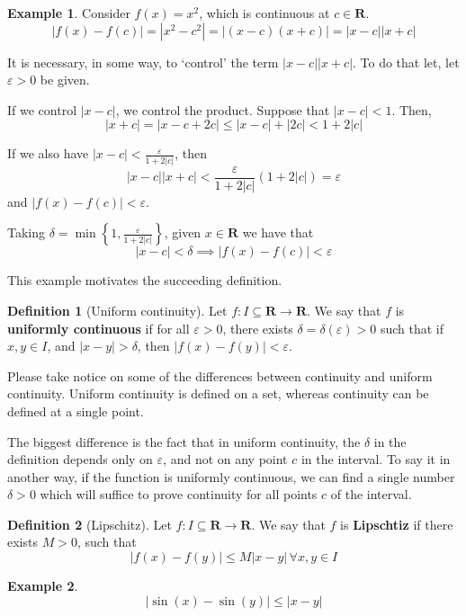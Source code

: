 \documentclass[12pt,a4paper]{article}
\theoremstyle{definition}
\newtheorem{example}{Example}[section]
\newtheorem{definition}{Definition}[section]
\begin{document}
\begin{example}
	Consider $f(x) = x^2$, which is continuous at $c \in \textbf{R}$. 
	\[
		| f(x) - f(c) | = |x^2 - c^2| = |(x-c)(x+c)| = |x-c| |x+c|
	\]
	
	It is necessary, in some way, to `control' the term $|x-c| |x+c|$. To do that let, let $\varepsilon > 0$ be given.
	
	If we control $|x-c|$, we control the product. Suppose that $|x-c| < 1$. Then,
	\[
		|x+c| = |x-c + 2c| \leq |x-c| + |2c| < 1 + 2|c|
	\]
	
	If we also have $| x- c | < \frac{\varepsilon}{1 + 2 |c|}$, then
	\[
		|x-c| |x+c| < \frac{\varepsilon}{1+2|c|} (1+2|c|) = \varepsilon
	\]
	and $|f(x) - f(c)| < \varepsilon$.
	
	Taking $\delta = \min \left\{ 1, \frac{\varepsilon}{1+2|c|} \right\}$, given $x \in \textbf{R}$ we have that 
	\[
		|x-c| < \delta \implies |f(x) - f(c)| < \varepsilon
	\]
\end{example}

This example motivates the succeeding definition.

\begin{definition}[Uniform continuity]
	Let $f : I \subseteq \textbf{R} \longrightarrow \textbf{R}$. We say that $f$ is \textbf{uniformly continuous} if for all $\varepsilon > 0$, there exists $\delta = \delta(\varepsilon) > 0$ such that if $x, y \in I$, and $|x-y| > \delta$, then $|f(x) - f(y)| < \varepsilon$.
\end{definition}

Please take notice on some of the differences between continuity and uniform continuity. Uniform continuity is defined on a set, whereas continuity can be defined at a single point.

The biggest difference is the fact that in uniform continuity, the $\delta$ in the definition depends only on $\varepsilon$, and not on any point $c$ in the interval. To say it in another way, if the function is uniformly continuous, we can find a single number $\delta > 0$ which will suffice to prove continuity for all points $c$ of the interval.

\begin{definition}[Lipschitz]
	Let $f : I \subseteq \textbf{R} \longrightarrow \textbf{R}$. We say that $f$ is \textbf{Lipschtiz} if there exists $M > 0$, such that 
	\[
		|f(x) - f(y) | \leq M |x-y| \, \forall x,y \in I
	\]
\end{definition}

\begin{example}
	\[
		| \sin(x) - \sin(y) | \leq |x-y|
	\]
\end{example}
\end{document}
